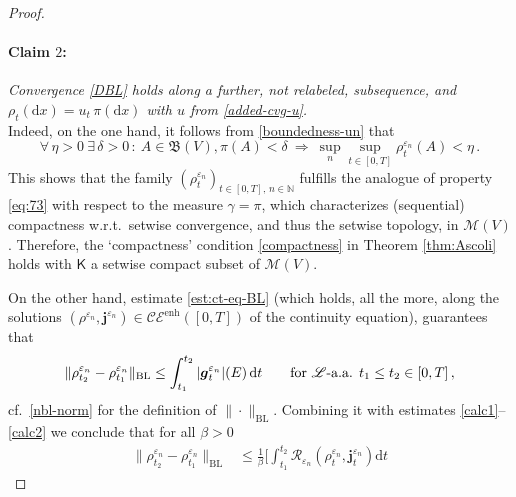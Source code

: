 \documentclass[11pt,reqno]{amsart}
\numberwithin{equation}{section}
\newcommand{\N}{\mathbb{N}}
\newcommand{\ENHCE}[2]{\calC \calE^{\mathrm{enh}}([#1,#2])}
\newcommand{\calC}{\mathcal{C}}
\newcommand{\calE}{\mathcal{E}}
\newcommand{\calM}{\mathcal{M}}
\newcommand{\scrL}{\mathscr{L}}
\newcommand{\eps}{\varepsilon}
\newcommand{\dd}{\mathrm{d}}
\theoremstyle{definition}
\newcommand{\ep}{\varepsilon}
\let\eps\ep
\def\dd{\mathrm{d}}
\newcommand{\Lebone}{\scrL}
\newcommand{\bj}{{\boldsymbol j}}
\newcommand{\scrR}{\mathscr{R}}
\newcommand{\bg}{{\boldsymbol{g}}}
\newcommand{\ej}{\eps_n}
\newcommand{\nbl}[1]{\|#1\|_{\mathrm{BL}} }
\newcommand{\RCR}{\color{magenta}}
\newcommand{\RNEW}{\color{black}} %
\newcommand{\TODOBS}[1]{\todo[inline, color=red!40]{#1}}
\newcommand{\EEE}{\color{black}}
\numberwithin{equation}{section}
\begin{document}
\begin{proof}
  \paragraph{\bf Claim $2$:}  {\sl  Convergence \eqref{DBL} holds along a further, not relabeled, subsequence, \RNEW and
 $ \rho_t(\dd x) = u_t\,   \pi(\dd x) $ with $u$ from \eqref{added-cvg-u}.} \EEE 
  \\
  Indeed,
  \RNEW on the one hand, it follows from \eqref{boundedness-un} that 
  \begin{equation}
  \label{setwise-compact}
     \forall\, \eta>0 \ \exists\, \delta>0 \, : \  A \in \mathfrak{B}(V),  \pi (A)<\delta \ \Longrightarrow \ \sup_n \sup_{t\in [0,T]} \rho_t^{\ej} (A) <\eta\,.
  \end{equation}
  \RNEW This shows that the family $( \rho_t^{\ej} )_{t\in [0,T],\, n \in \N}$ fulfills the analogue of property 
  \eqref{eq:73} with respect to the measure $\gamma =\pi$, which characterizes (sequential) compactness w.r.t.\ setwise convergence, \RCR and thus the setwise 
  topology, 
   in $\calM(V)$. 
   Therefore, the `compactness' condition   \eqref{compactness}  in Theorem \ref{thm:Ascoli}  holds with $\mathsf{K} $ a setwise  compact subset of $\calM(V) $. \EEE
    \par
  On the other hand, \EEE
   estimate
  \eqref{est:ct-eq-BL}	 (which holds, all the more, along the solutions $(\rho^{\ej}, \bj^{\ej}) \in \ENHCE 0T$ of the continuity equation), guarantees that 
  \[
     \nbl{\rho_{t_2}^{\ej}- \rho_{t_1}^{\ej}} \leq 
  \int_{t_1}^{t_2} \RNEW  |\bg_t^{\ej}|(E) \EEE \, \dd t \qquad \text{for  }\Lebone\text{-a.a. }  t_1 \leq t_2 \in [0,T]\,,
  \]
    \RNEW cf.\ \eqref{nbl-norm} for the definition of $\nbl{\cdot}$. \EEE
  Combining it with estimates \eqref{calc1}--\eqref{calc2} we conclude that for all $\beta>0$
  \begin{equation}
  \label{Ascoli}
  \begin{aligned}
    \nbl{ \rho_{t_2}^{\ej} {-} \rho_{t_1}^{\ej}} &  \leq 
   \frac1\beta 
       \Big[ \int_{t_1}^{t_2}
\scrR_{\ej} (\rho_t^{\ej}, \bj_t^{\ej}) \dd t 

\end{aligned}
\end{equation}
\end{proof}
\end{document}
